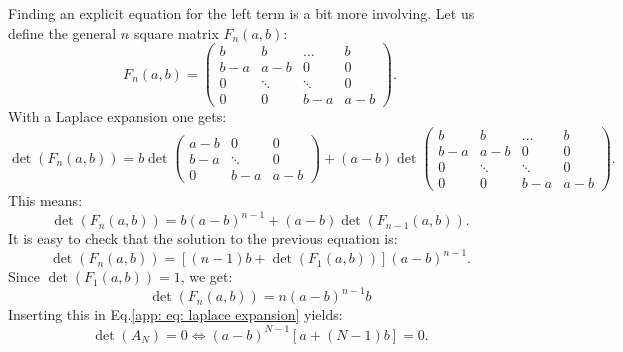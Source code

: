 \documentclass[12pt, titlepage, twoside, openright]{report}
\begin{document}
  Finding an explicit equation for the left term is a bit more involving. Let us define the general $n$ square matrix $F_n(a,b)$:
  \begin{equation}
  F_n(a,b) = \begin{pmatrix}
  b & b & \dots & b \\
  b-a & a-b & 0 & 0 \\
  0 & \ddots & \ddots & 0 \\
  0 & 0 & b-a & a-b
  \end{pmatrix}.
  \end{equation}
  With a Laplace expansion one gets:
  \begin{equation}
  \det\left(F_n(a,b)\right)= b
  \det\begin{pmatrix}
  a-b & 0 & 0 \\
  b-a & \ddots & 0 \\
  0 & b-a & a-b
  \end{pmatrix}+(a-b)\det\begin{pmatrix}
  b & b & \dots & b \\
  b-a & a-b & 0 & 0 \\
  0 & \ddots & \ddots & 0 \\
  0 & 0 & b-a & a-b
  \end{pmatrix}.
  \end{equation}
  This means:
  \begin{equation}
  \det(F_n(a,b))=b(a-b)^{n-1}+(a-b)\det(F_{n-1}(a,b)).
  \end{equation}
  It is easy to check that the solution to the previous equation is:
  \begin{equation}
  \det(F_n(a,b))=\left[(n-1)b+\det\left(F_1(a,b)\right)\right](a-b)^{n-1}.
  \end{equation}
  Since $\det\left(F_1(a,b)\right)=1$, we get:
  \begin{equation}
  \det\left(F_n(a,b)\right)=n(a-b)^{n-1}b
  \end{equation}
  Inserting this in Eq.\eqref{app: eq: laplace expansion} yields:
  \begin{equation}
  {
  \det(A_N)=0 \iff (a-b)^{N-1}\left[a+(N-1)b\right]=0.
  }\label{eq: formula special determinant}
  \end{equation}
\end{document}
